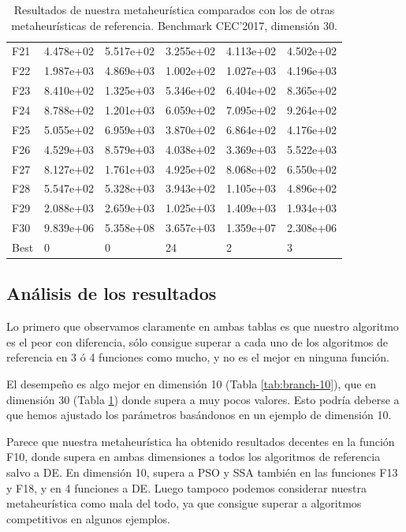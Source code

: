 \documentclass{article}
\begin{document}
\begin{table}[H]
\begin{tabular}{|l|lllll|}
		F21  &  4.478e+02 &  5.517e+02 &  3.255e+02 &  4.113e+02 &  4.502e+02 \\
		F22  &  1.987e+03 &  4.869e+03 &  1.002e+02 &  1.027e+03 &  4.196e+03 \\
		F23  &  8.410e+02 &  1.325e+03 &  5.346e+02 &  6.404e+02 &  8.365e+02 \\
		F24  &  8.788e+02 &  1.201e+03 &  6.059e+02 &  7.095e+02 &  9.264e+02 \\
		F25  &  5.055e+02 &  6.959e+03 &  3.870e+02 &  6.864e+02 &  4.176e+02 \\
		F26  &  4.529e+03 &  8.579e+03 &  4.038e+02 &  3.369e+03 &  5.522e+03 \\
		F27  &  8.127e+02 &  1.761e+03 &  4.925e+02 &  8.068e+02 &  6.550e+02 \\
		F28  &  5.547e+02 &  5.328e+03 &  3.943e+02 &  1.105e+03 &  4.896e+02 \\
		F29  &  2.088e+03 &  2.659e+03 &  1.025e+03 &  1.409e+03 &  1.934e+03 \\
		F30  &  9.839e+06 &  5.358e+08 &  3.657e+03 &  1.359e+07 &  2.308e+06 \\\hline
		Best &          0 &          0 &         24 &          2 &          3 \\
		\hline
	\end{tabular}
	\caption{Resultados de nuestra metaheurística comparados con los de otras metaheurísticas de referencia. Benchmark CEC'2017, dimensión 30.}
	\label{tab:branch-30}
\end{table}

\subsection{Análisis de los resultados}

Lo primero que observamos claramente en ambas tablas es que nuestro algoritmo es el peor con diferencia, sólo consigue superar a
cada uno de los algoritmos de referencia en 3 ó 4 funciones como mucho, y no es el mejor en ninguna función. 

El desempeño es algo
mejor en dimensión 10 (Tabla \ref{tab:branch-10}), que en dimensión 30 (Tabla \ref{tab:branch-30}) donde supera a muy pocos valores.
Esto podría deberse a que hemos ajustado los parámetros basándonos en un ejemplo de dimensión 10.

Parece que nuestra metaheurística ha obtenido resultados decentes en la función F10, donde supera en ambas dimensiones a todos los
algoritmos de referencia salvo a DE. En dimensión 10, supera a PSO y SSA también en las funciones F13 y F18, y en 4 funciones a DE.
Luego tampoco podemos considerar nuestra metaheurística como mala del todo, ya que consigue superar a algoritmos competitivos en
algunos ejemplos.
\end{document}

